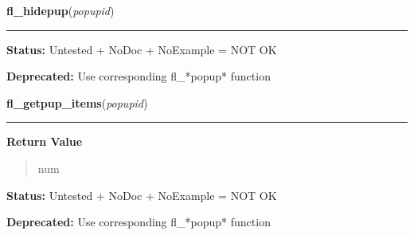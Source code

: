     \label{xformslib:library:fl_hidepup}

    \vspace{0.5ex}

\hspace{.8\funcindent}\begin{boxedminipage}{\funcwidth}

    \raggedright \textbf{fl\_hidepup}(\textit{popupid})

    \vspace{-1.5ex}

    \rule{\textwidth}{0.5\fboxrule}
\setlength{\parskip}{2ex}
\setlength{\parskip}{1ex}
\textbf{Status:} Untested + NoDoc + NoExample = NOT OK



\textbf{Deprecated:} Use corresponding fl\_*popup* function



    \end{boxedminipage}

    \label{xformslib:library:fl_getpup_items}

    \vspace{0.5ex}

\hspace{.8\funcindent}\begin{boxedminipage}{\funcwidth}

    \raggedright \textbf{fl\_getpup\_items}(\textit{popupid})

    \vspace{-1.5ex}

    \rule{\textwidth}{0.5\fboxrule}
\setlength{\parskip}{2ex}
\setlength{\parskip}{1ex}
      \textbf{Return Value}
    \vspace{-1ex}

      \begin{quote}
      num

      \end{quote}

\textbf{Status:} Untested + NoDoc + NoExample = NOT OK



\textbf{Deprecated:} Use corresponding fl\_*popup* function



    \end{boxedminipage}

